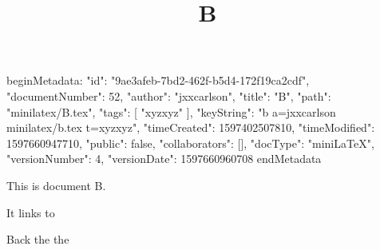 beginMetadata:
{
    "id": "9ae3afeb-7bd2-462f-b5d4-172f19ca2cdf",
    "documentNumber": 52,
    "author": "jxxcarlson",
    "title": "B",
    "path": "minilatex/B.tex",
    "tags": [
        "xyzxyz"
    ],
    "keyString": "b a=jxxcarlson minilatex/b.tex t=xyzxyz",
    "timeCreated": 1597402507810,
    "timeModified": 1597660947710,
    "public": false,
    "collaborators": [],
    "docType": "miniLaTeX",
    "versionNumber": 4,
    "versionDate": 1597660960708
}
endMetadata
\title{B}

\maketitle

This is document B.

It links to 


Back the the 


